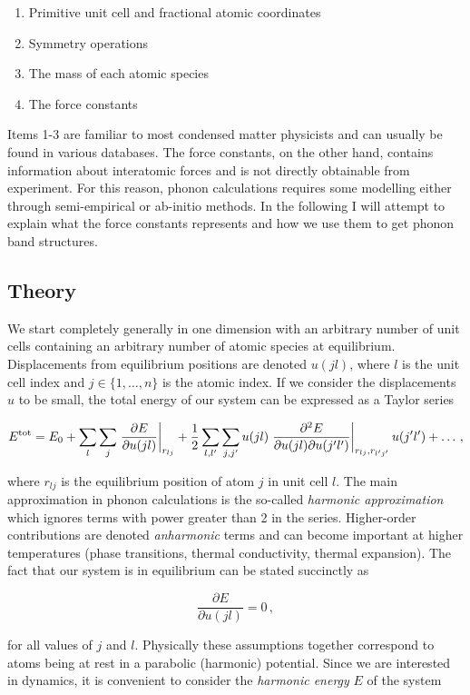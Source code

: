 \begin{enumerate}
	\item Primitive unit cell and fractional atomic coordinates
	\item Symmetry operations
	\item The mass of each atomic species
	\item The force constants
\end{enumerate}

Items 1-3 are familiar to most condensed matter physicists and can usually be found in various databases. The force constants, on the other hand, contains information about interatomic forces and is not directly obtainable from experiment. For this reason, phonon calculations requires some modelling either through semi-empirical or ab-initio methods. In the following I will attempt to explain what the force constants represents and how we use them to get phonon band structures.

\subsection{Theory}
We start completely generally in one dimension with an arbitrary number of unit cells containing an arbitrary number of atomic species at equilibrium. Displacements from equilibrium positions are denoted $u(jl)$, where $l$ is the unit cell index and $j \in \{1,\dots,n\}$ is the atomic index. If we consider the displacements $u$ to be small, the total energy of our system can be expressed as a Taylor series

\[ E^\text{tot} = E_0 + \sum_{l}\sum_{j} \left. \frac{\partial E}{\partial u(jl)} \right\rvert_{r_{lj}}  + \frac{1}{2} \sum_{l,l^\prime} \sum_{j,j^\prime} u(jl) \left. \frac{\partial ^2 E}{\partial u(jl) \partial u(j^\prime l^\prime)} \right\rvert_{r_{lj}, r_{l^\prime j^\prime}} u(j^\prime l^\prime) + \dots \, , \]

\noindent where $r_{lj}$ is the equilibrium position of atom $j$ in unit cell $l$. The main approximation in phonon calculations is the so-called \emph{harmonic approximation} which ignores terms with power greater than 2 in the series. Higher-order contributions are denoted \emph{anharmonic} terms and can become important at higher temperatures (phase transitions, thermal conductivity, thermal expansion). The fact that our system is in equilibrium can be stated succinctly as

\[ \frac{\partial E}{\partial u(jl)} = 0 \, , \]

\noindent for all values of $j$ and $l$. Physically these assumptions together correspond to atoms being at rest in a parabolic (harmonic) potential. Since we are interested in  dynamics, it is convenient to consider the \emph{harmonic energy} $E$ of the system

